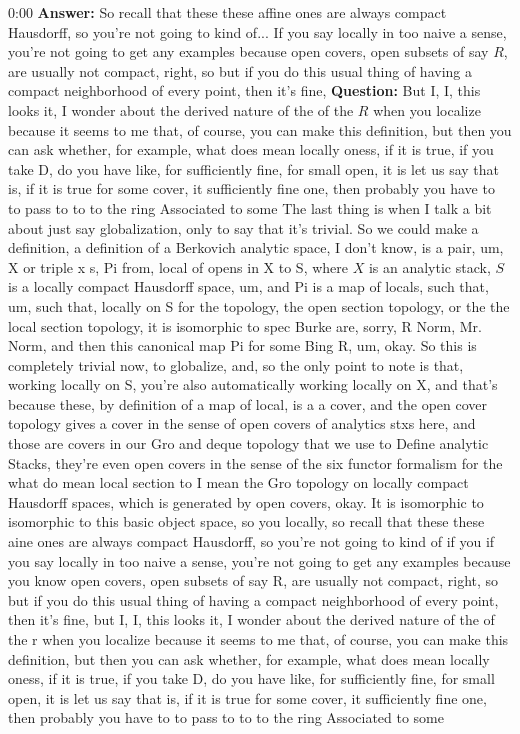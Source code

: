 \begin{unfinished}{0:00}
\textbf{Answer:} So recall that these these affine ones are always compact Hausdorff, so you're not going to kind of... If you say locally in too naive a sense, you're not going to get any examples because open covers, open subsets of say $R$, are usually not compact, right, so but if you do this usual thing of having a compact neighborhood of every point, then it's fine, 
\textbf{Question:} But I, I, this looks it, I wonder about the derived nature of the of the $R$ when you localize because it seems to me that, of course, you can make this definition, but then you can ask whether, for example, what does mean locally oness, if it is true, if you take D, do you have like, for sufficiently fine, for small open, it is let us say that is, if it is true for some cover, it sufficiently fine one, then probably you have to to pass to to to the ring Associated to some
The last thing is when I talk a bit about just say globalization, only to say that it's trivial. So we could make a definition, a definition of a Berkovich analytic space, I don't know, is a pair, um, X or triple x s, Pi from, local of opens in X to S, where $X$ is an analytic stack, $S$ is a locally compact Hausdorff space, um, and Pi is a map of locals, such that, um, such that, locally on S for the topology, the open section topology, or the the local section topology, it is isomorphic to spec Burke are, sorry, R Norm, Mr. Norm, and then this canonical map Pi for some Bing R, um, okay. So this is completely trivial now, to globalize, and, so the only point to note is that, working locally on S, you're also automatically working locally on X, and that's because these, by definition of a map of local, is a a cover, and the open cover topology gives a cover in the sense of open covers of analytics stxs here, and those are covers in our Gro and deque topology that we use to Define analytic Stacks, they're even open covers in the sense of the six functor formalism for the what do mean local section to I mean the Gro topology on locally compact Hausdorff spaces, which is generated by open covers, okay. It is isomorphic to isomorphic to this basic object space, so you locally, so recall that these these aine ones are always compact Hausdorff, so you're not going to kind of if you if you say locally in too naive a sense, you're not going to get any examples because you know open covers, open subsets of say R, are usually not compact, right, so but if you do this usual thing of having a compact neighborhood of every point, then it's fine, but I, I, this looks it, I wonder about the derived nature of the of the r when you localize because it seems to me that, of course, you can make this definition, but then you can ask whether, for example, what does mean locally oness, if it is true, if you take D, do you have like, for sufficiently fine, for small open, it is let us say that is, if it is true for some cover, it sufficiently fine one, then probably you have to to pass to to to the ring Associated to some

\end{unfinished}
